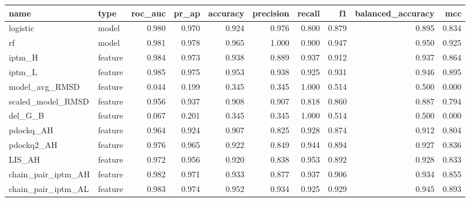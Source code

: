 \begin{tabular}{llrrrrrrrr}
\toprule
name & type & roc_auc & pr_ap & accuracy & precision & recall & f1 & balanced_accuracy & mcc \\
\midrule
logistic & model & 0.980 & 0.970 & 0.924 & 0.976 & 0.800 & 0.879 & 0.895 & 0.834 \\
rf & model & 0.981 & 0.978 & 0.965 & 1.000 & 0.900 & 0.947 & 0.950 & 0.925 \\
iptm_H & feature & 0.984 & 0.973 & 0.938 & 0.889 & 0.937 & 0.912 & 0.937 & 0.864 \\
iptm_L & feature & 0.985 & 0.975 & 0.953 & 0.938 & 0.925 & 0.931 & 0.946 & 0.895 \\
model_avg_RMSD & feature & 0.044 & 0.199 & 0.345 & 0.345 & 1.000 & 0.514 & 0.500 & 0.000 \\
scaled_model_RMSD & feature & 0.956 & 0.937 & 0.908 & 0.907 & 0.818 & 0.860 & 0.887 & 0.794 \\
del_G_B & feature & 0.067 & 0.201 & 0.345 & 0.345 & 1.000 & 0.514 & 0.500 & 0.000 \\
pdockq_AH & feature & 0.964 & 0.924 & 0.907 & 0.825 & 0.928 & 0.874 & 0.912 & 0.804 \\
pdockq2_AH & feature & 0.976 & 0.965 & 0.922 & 0.849 & 0.944 & 0.894 & 0.927 & 0.836 \\
LIS_AH & feature & 0.972 & 0.956 & 0.920 & 0.838 & 0.953 & 0.892 & 0.928 & 0.833 \\
chain_pair_iptm_AH & feature & 0.982 & 0.971 & 0.933 & 0.877 & 0.937 & 0.906 & 0.934 & 0.855 \\
chain_pair_iptm_AL & feature & 0.983 & 0.974 & 0.952 & 0.934 & 0.925 & 0.929 & 0.945 & 0.893 \\
\bottomrule
\end{tabular}

